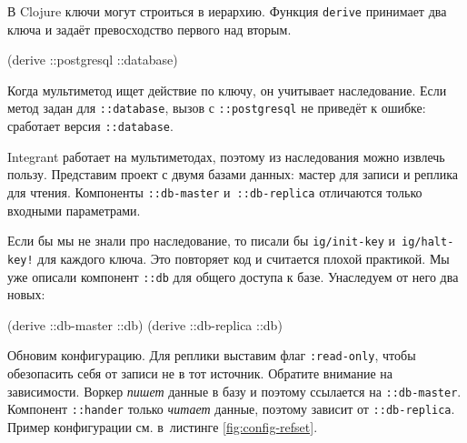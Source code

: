 
В Clojure ключи могут строиться в иерархию. Функция \verb|derive| принимает
два ключа и задаёт превосходство первого над вторым.


\begin{english}
  \begin{clojure}
(derive ::postgresql ::database)
  \end{clojure}
\end{english}

\mnoindent
Когда мультиметод ищет действие по ключу, он учитывает наследование. Если метод
задан для \verb|::database|, вызов с \verb|::postgresql| не приведёт к ошибке:
сработает версия \verb|::database|.

Integrant работает на мультиметодах, поэтому из наследования можно извлечь
пользу. Представим проект с двумя базами данных: мастер для записи и реплика для
чтения. Компоненты \verb|::db-master| и~\verb|::db-replica| отличаются только
входными параметрами.

Если бы мы не знали про наследование, то писали бы \verb|ig/init-key|
и~\verb|ig/halt-key!| для каждого ключа. Это повторяет код и считается плохой
практикой. Мы уже описали компонент \verb|::db| для общего доступа к
базе. Унаследуем от него два новых:

\begin{english}
  \begin{clojure}
(derive ::db-master ::db)
(derive ::db-replica ::db)
  \end{clojure}
\end{english}

Обновим конфигурацию. Для реплики выставим флаг \verb|:read-only|, чтобы
обезопасить себя от записи не в тот источник. Обратите внимание на
зависимости. Воркер \emph{пишет} данные в базу и поэтому ссылается на
\verb|::db-master|. Компонент \verb|::hander| только \emph{читает} данные,
поэтому зависит от \verb|::db-replica|. Пример конфигурации см. в~листинге
\ref{fig:config-refset}.


